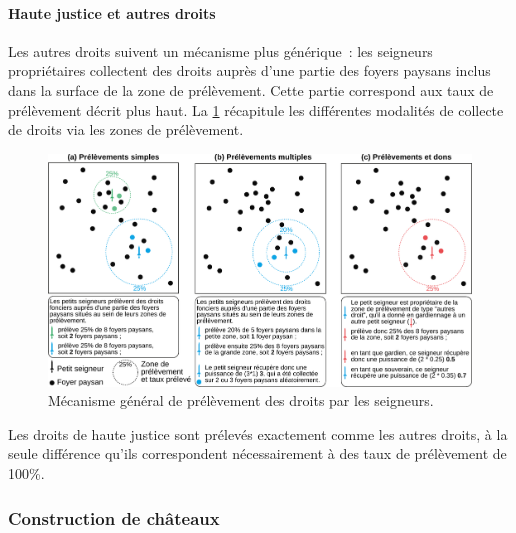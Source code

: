 \paragraph{Haute justice et autres droits}

Les autres droits suivent un mécanisme plus générique : les seigneurs propriétaires collectent des droits auprès d'une partie des foyers paysans inclus dans la surface de la zone de prélèvement.
Cette partie correspond aux \og taux de prélèvement\fg{} décrit plus haut. La \cref{fig:prelevement-droits} récapitule les différentes modalités de collecte de droits via les zones de prélèvement.

\begin{figure}[H]
	\centering
	\includegraphics[width=\linewidth]{img/prelevements_droits.pdf}
	\caption{Mécanisme général de prélèvement des droits par les seigneurs.}
	\label{fig:prelevement-droits}
\end{figure}

Les droits de haute justice sont prélevés exactement comme les autres droits, à la seule différence qu'ils correspondent nécessairement à des taux de prélèvement de 100\%.

\subsubsection{Construction de châteaux \label{sssec:constru-chateaux}}


